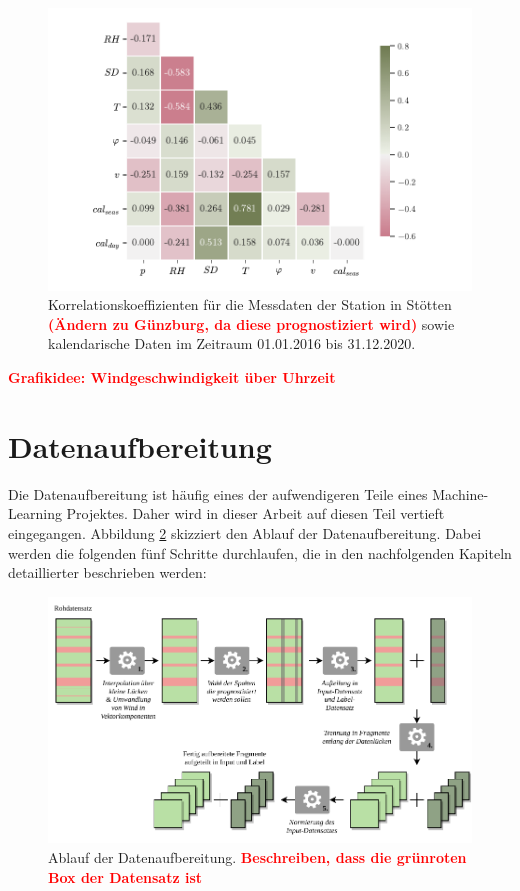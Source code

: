 \documentclass[
12pt, %
toc=listofnumbered, %
toc=chapterentrydotfill, %
numbers=noenddot, %
captions=tableheading, %
bibliography=numbered
]{scrreprt}
\let\Oldsection\section
\renewcommand{\section}{\FloatBarrier\Oldsection}
\newcommand{\highlight}[1]{\textbf{\textcolor{red}{#1}}}
\begin{document}
\begin{figure}[tph]
	\begin{center}
		\includegraphics[]{./images/corr.pdf}
		\caption{Korrelationskoeffizienten für die Messdaten der Station in Stötten \highlight{(Ändern zu Günzburg, da diese prognostiziert wird)} sowie kalendarische Daten im Zeitraum 01.01.2016 bis 31.12.2020.}
		\label{fig:corr}
	\end{center}
\end{figure}

\highlight{Grafikidee: Windgeschwindigkeit über Uhrzeit}

\section{Datenaufbereitung}\label{section:Datenaufbereitung}
Die Datenaufbereitung ist häufig eines der aufwendigeren Teile eines Machine-Learning Projektes. Daher wird in dieser Arbeit auf diesen Teil vertieft eingegangen. Abbildung \ref{fig:preprocessing} skizziert den Ablauf der Datenaufbereitung. Dabei werden die folgenden fünf Schritte durchlaufen, die in den nachfolgenden Kapiteln detaillierter beschrieben werden:

\begin{figure}[tph]
	\begin{center}
		\includegraphics[]{./images/preprocessing.pdf}
		\caption{Ablauf der Datenaufbereitung. \highlight{Beschreiben, dass die grünroten Box der Datensatz ist}}
		\label{fig:preprocessing}
	\end{center}
\end{figure}
\end{document}
